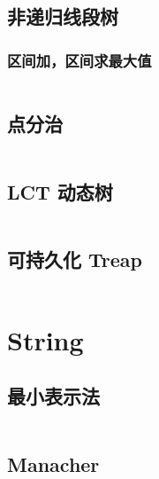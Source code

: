 \documentclass[titlepage, a4paper]{article}
\begin{document}
\begin{multicols}{2}
\begin{spacing}{0.6}
				\subsection{非递归线段树}
					\subsubsection{区间加，区间求最大值}
						\inputminted{cpp}{src/DataStructure/非递归线段树求最大值.cpp}
				\subsection{点分治}
					\inputminted{cpp}{src/DataStructure/点分治.cpp}
				\subsection{LCT 动态树}
					\inputminted{cpp}{src/DataStructure/LCT.cpp}
				\subsection{可持久化 Treap}
					\inputminted{cpp}{src/DataStructure/可持久化treap-zmc.cpp}
			
			\section{String}
				\subsection{最小表示法}
					\inputminted{cpp}{src/String/最小表示法.cpp}
				\subsection{Manacher}
					\inputminted{cpp}{src/String/Manacher.cpp}

\end{spacing}
\end{multicols}
\end{document}
